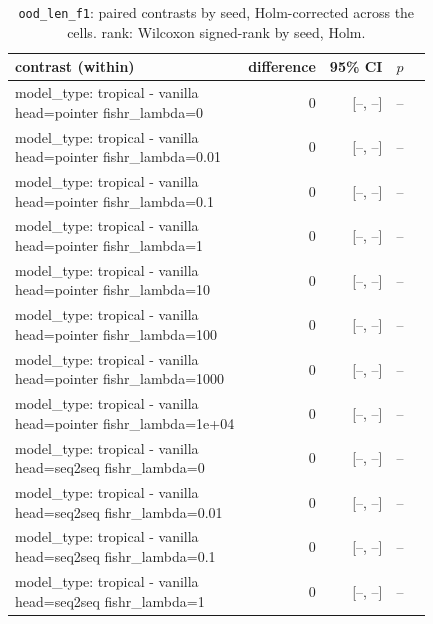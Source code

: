 \documentclass[10pt]{article}
\makeatletter
\newcommand{\stackcell}[1]{\begin{tabular}[t]{@{}l@{}}#1\end{tabular}}
\makeatother
\begin{document}
{\small
\begin{longtable}{lrrrl}
\caption{\texttt{ood\_len\_f1}: paired contrasts by seed, Holm-corrected across the cells. rank: Wilcoxon signed-rank by seed, Holm.}\label{tab:paired-ood_len_f1}\\
\toprule
contrast (within) & difference & 95\% CI & $p$ & \\
\midrule
\endhead
\stackcell{model\_type: tropical - vanilla\\\footnotesize head=pointer fishr\_lambda=0 } & 0 & [--, --] & -- & \\
\stackcell{model\_type: tropical - vanilla\\\footnotesize head=pointer fishr\_lambda=0.01 } & 0 & [--, --] & -- & \\
\stackcell{model\_type: tropical - vanilla\\\footnotesize head=pointer fishr\_lambda=0.1 } & 0 & [--, --] & -- & \\
\stackcell{model\_type: tropical - vanilla\\\footnotesize head=pointer fishr\_lambda=1 } & 0 & [--, --] & -- & \\
\stackcell{model\_type: tropical - vanilla\\\footnotesize head=pointer fishr\_lambda=10 } & 0 & [--, --] & -- & \\
\stackcell{model\_type: tropical - vanilla\\\footnotesize head=pointer fishr\_lambda=100 } & 0 & [--, --] & -- & \\
\stackcell{model\_type: tropical - vanilla\\\footnotesize head=pointer fishr\_lambda=1000 } & 0 & [--, --] & -- & \\
\stackcell{model\_type: tropical - vanilla\\\footnotesize head=pointer fishr\_lambda=1e+04 } & 0 & [--, --] & -- & \\
\stackcell{model\_type: tropical - vanilla\\\footnotesize head=seq2seq fishr\_lambda=0 } & 0 & [--, --] & -- & \\
\stackcell{model\_type: tropical - vanilla\\\footnotesize head=seq2seq fishr\_lambda=0.01 } & 0 & [--, --] & -- & \\
\stackcell{model\_type: tropical - vanilla\\\footnotesize head=seq2seq fishr\_lambda=0.1 } & 0 & [--, --] & -- & \\
\stackcell{model\_type: tropical - vanilla\\\footnotesize head=seq2seq fishr\_lambda=1 } & 0 & [--, --] & -- & \\

\end{longtable}}
\end{document}
